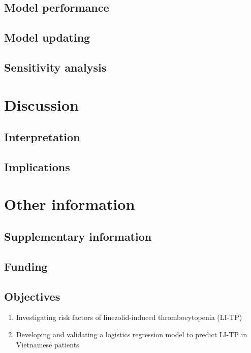 \documentclass[
  letterpaper,
  DIV=11,
  numbers=noendperiod]{scrartcl}
\providecommand{\tightlist}{%
  \setlength{\itemsep}{0pt}\setlength{\parskip}{0pt}}\usepackage{longtable,booktabs,array}
\begin{document}
\subsection{Model performance}\label{model-performance}

\subsection{Model updating}\label{model-updating}

\subsection{Sensitivity analysis}\label{sensitivity-analysis-1}

\section{Discussion}\label{discussion}

\subsection{Interpretation}\label{interpretation}

\subsection{Implications}\label{implications}

\section{Other information}\label{other-information}

\subsection{Supplementary information}\label{supplementary-information}

\subsection{Funding}\label{funding}

\subsection{Objectives}\label{objectives}

\begin{enumerate}
\def\labelenumi{\arabic{enumi}.}
\tightlist
\item
  Investigating risk factors of linezolid-induced thrombocytopenia
  (LI-TP)
\item
  Developing and validating a logistics regression model to predict
  LI-TP in Vietnamese patients
\end{enumerate}
\end{document}
